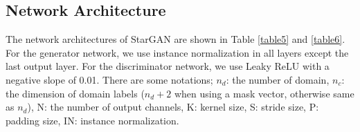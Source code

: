 \documentclass[10pt,twocolumn,letterpaper]{article}
\begin{document}
\medskip

\subsection{Network Architecture} 
The network architectures of StarGAN are shown in Table \ref{table5} and \ref{table6}.  For the generator network, we use instance normalization in all layers except the last output layer. For the discriminator network, we use Leaky ReLU with a negative slope of 0.01. There are some notations; ${n}_{d}$: the number of domain, ${n}_{c}$: the dimension of domain labels (${n}_{d}+2$ when using a mask vector, otherwise same as ${n}_{d}$), N: the number of output channels, K: kernel size, S: stride size, P: padding size, IN: instance normalization.

\medskip

\end{document}
